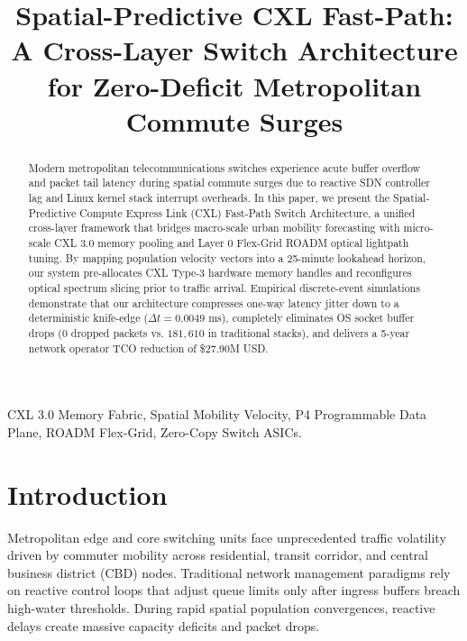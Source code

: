 \documentclass[conference]{IEEEtran}
\begin{document}
\title{Spatial-Predictive CXL Fast-Path: A Cross-Layer Switch Architecture for Zero-Deficit Metropolitan Commute Surges}

\author{
}

\maketitle

\begin{abstract}
Modern metropolitan telecommunications switches experience acute buffer overflow and packet tail latency during spatial commute surges due to reactive SDN controller lag and Linux kernel stack interrupt overheads. In this paper, we present the Spatial-Predictive Compute Express Link (CXL) Fast-Path Switch Architecture, a unified cross-layer framework that bridges macro-scale urban mobility forecasting with micro-scale CXL 3.0 memory pooling and Layer 0 Flex-Grid ROADM optical lightpath tuning. By mapping population velocity vectors into a 25-minute lookahead horizon, our system pre-allocates CXL Type-3 hardware memory handles and reconfigures optical spectrum slicing prior to traffic arrival. Empirical discrete-event simulations demonstrate that our architecture compresses one-way latency jitter down to a deterministic knife-edge ($\Delta t = 0.0049\text{ ms}$), completely eliminates OS socket buffer drops ($0$ dropped packets vs. $181,610$ in traditional stacks), and delivers a 5-year network operator TCO reduction of \$27.90M USD.
\end{abstract}

\begin{IEEEkeywords}
CXL 3.0 Memory Fabric, Spatial Mobility Velocity, P4 Programmable Data Plane, ROADM Flex-Grid, Zero-Copy Switch ASICs.
\end{IEEEkeywords}

\section{Introduction}
Metropolitan edge and core switching units face unprecedented traffic volatility driven by commuter mobility across residential, transit corridor, and central business district (CBD) nodes. Traditional network management paradigms rely on reactive control loops that adjust queue limits only after ingress buffers breach high-water thresholds. During rapid spatial population convergences, reactive delays create massive capacity deficits and packet drops.
\end{document}
